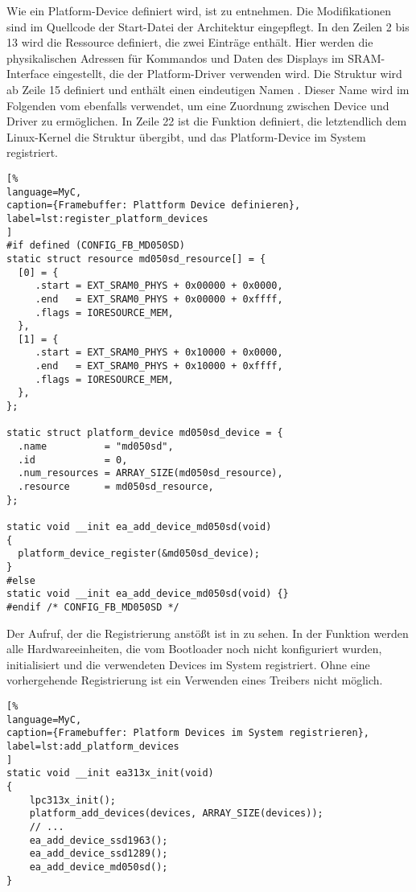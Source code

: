 Wie ein Platform-Device definiert wird, ist  zu entnehmen. Die Modifikationen sind im Quellcode der Start-Datei der Architektur  eingepflegt. In den Zeilen 2 bis 13 wird die Ressource  definiert, die zwei Einträge enthält. Hier werden die physikalischen Adressen für Kommandos und Daten des Displays im SRAM-Interface eingestellt, die der Platform-Driver verwenden wird. Die Struktur  wird ab Zeile 15 definiert und enthält einen eindeutigen Namen . Dieser Name wird im Folgenden vom  ebenfalls verwendet, um eine Zuordnung zwischen Device und Driver zu ermöglichen.
In Zeile 22 ist die Funktion definiert, die letztendlich dem Linux-Kernel die Struktur  übergibt, und das Platform-Device im System registriert. 
\begin{lstlisting}[%
language=MyC,
caption={Framebuffer: Plattform Device definieren},
label=lst:register_platform_devices
]
#if defined (CONFIG_FB_MD050SD)
static struct resource md050sd_resource[] = {
  [0] = {
     .start = EXT_SRAM0_PHYS + 0x00000 + 0x0000,
     .end   = EXT_SRAM0_PHYS + 0x00000 + 0xffff,
     .flags = IORESOURCE_MEM,
  },
  [1] = {
     .start = EXT_SRAM0_PHYS + 0x10000 + 0x0000,
     .end   = EXT_SRAM0_PHYS + 0x10000 + 0xffff,
     .flags = IORESOURCE_MEM,
  },
};

static struct platform_device md050sd_device = {
  .name          = "md050sd",
  .id            = 0,
  .num_resources = ARRAY_SIZE(md050sd_resource),
  .resource      = md050sd_resource,
};

static void __init ea_add_device_md050sd(void)
{
  platform_device_register(&md050sd_device);
}
#else
static void __init ea_add_device_md050sd(void) {}
#endif /* CONFIG_FB_MD050SD */
\end{lstlisting}
Der Aufruf, der die Registrierung anstößt ist in  zu sehen. In der Funktion  werden alle Hardwareeinheiten, die vom Bootloader noch nicht konfiguriert wurden, initialisiert und die verwendeten Devices im System registriert. Ohne eine vorhergehende Registrierung ist ein Verwenden eines Treibers nicht möglich.

\begin{lstlisting}[%
language=MyC,
caption={Framebuffer: Platform Devices im System registrieren},
label=lst:add_platform_devices
]
static void __init ea313x_init(void)
{
	lpc313x_init();
	platform_add_devices(devices, ARRAY_SIZE(devices));
    // ...
	ea_add_device_ssd1963();
	ea_add_device_ssd1289();
	ea_add_device_md050sd();
}
\end{lstlisting}

